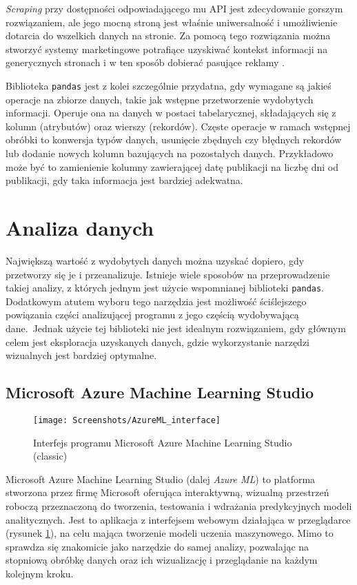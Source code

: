 \emph{Scraping} przy dostępności odpowiadającego mu API jest zdecydowanie gorszym rozwiązaniem, ale jego mocną stroną jest właśnie uniwersalność i umożliwienie dotarcia do wszelkich danych na stronie.
Za pomocą tego rozwiązania można stworzyć systemy marketingowe potrafiące uzyskiwać kontekst informacji na generycznych stronach i w ten sposób dobierać pasujące reklamy \cite{vargiu2013exploiting}.

Biblioteka \texttt{pandas} jest z kolei szczególnie przydatna, gdy wymagane są jakieś operacje na zbiorze danych, takie jak wstępne przetworzenie wydobytych informacji.
Operuje ona na danych w postaci tabelarycznej, składających się z kolumn (atrybutów) oraz wierszy (rekordów).
Częste operacje w ramach wstępnej obróbki to konwersja typów danych, usunięcie zbędnych czy błędnych rekordów lub dodanie nowych kolumn bazujących na pozostałych danych.
Przykładowo może być to zamienienie kolumny zawierającej datę publikacji na liczbę dni od publikacji, gdy taka informacja jest bardziej adekwatna.

\section{Analiza danych}

Największą wartość z wydobytych danych można uzyskać dopiero, gdy przetworzy się je i przeanalizuje.
Istnieje wiele sposobów na przeprowadzenie takiej analizy, z których jednym jest użycie wspomnianej biblioteki \texttt{pandas}.
Dodatkowym atutem wyboru tego narzędzia jest możliwość ściślejszego powiązania części analizującej programu z jego częścią wydobywającą dane.\
Jednak użycie tej biblioteki nie jest idealnym rozwiązaniem, gdy głównym celem jest eksploracja uzyskanych danych, gdzie wykorzystanie narzędzi wizualnych jest bardziej optymalne.

\subsection{Microsoft Azure Machine Learning Studio}

\begin{figure}[ht]
	\texttt{[image: Screenshots/AzureML\_interface]}
	\caption{Interfejs programu Microsoft Azure Machine Learning Studio (classic)}
	\label{fig:interface}
\end{figure}

Microsoft Azure Machine Learning Studio (dalej \emph{Azure ML}) to platforma stworzona przez firmę Microsoft oferująca interaktywną, wizualną przestrzeń roboczą przeznaczoną do tworzenia, testowania i wdrażania predykcyjnych modeli analitycznych.
Jest to aplikacja z interfejsem webowym działająca w przeglądarce (rysunek \ref{fig:interface}), na celu mająca tworzenie modeli uczenia maszynowego.
Mimo to sprawdza się znakomicie jako narzędzie do samej analizy, pozwalając na stopniową obróbkę danych oraz ich wizualizację i przeglądanie na każdym kolejnym kroku.

